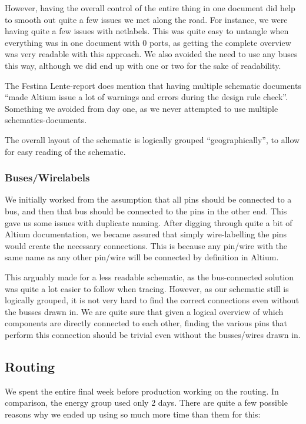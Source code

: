 However, having the overall control of the entire thing in one document
did help to smooth out quite a few issues we met along the road. For instance,
we were having quite a few issues with netlabels. This was quite easy to
untangle when everything was in one document with 0 ports, as getting the
complete overview was very readable with this approach. We also avoided the need
to use any buses this way, although we did end up with one or two for the sake
of readability.

  The
Festina Lente-report does mention that having multiple schematic documents
``made Altium issue a lot of warnings and errors during the design rule
check''\cite[p.~49]{berg2011festinalente}. Something we avoided from day one, as
we never attempted to use multiple schematics-documents. 

The overall layout of the schematic is logically grouped ``geographically'', to
allow for easy reading of the schematic.

\subsubsection {Buses/Wirelabels}
We initially worked from the assumption that all pins should be connected to a
bus, and then that bus should be connected to the pins in the other end. This
gave us some issues with duplicate naming. After digging through quite a bit of
Altium documentation, we became assured that simply wire-labelling the pins
would create the necessary connections. This is because any pin/wire with the
same name as any other pin/wire will be connected by definition in Altium.

This arguably made for a less readable schematic, as the bus-connected solution
was quite a lot easier to follow when tracing. However, as our schematic still
is logically grouped, it is not very hard to find the correct connections even
without the busses drawn in. We are quite sure that given a logical overview of
which components are directly connected to each other, finding the various pins
that perform this connection should be trivial even without the busses/wires
drawn in.


\subsection {Routing}

We spent the entire final week before production working on the routing. In comparison, the energy group used only 2 days. There are quite a few possible reasons why we ended up using so much more time than them for this:

